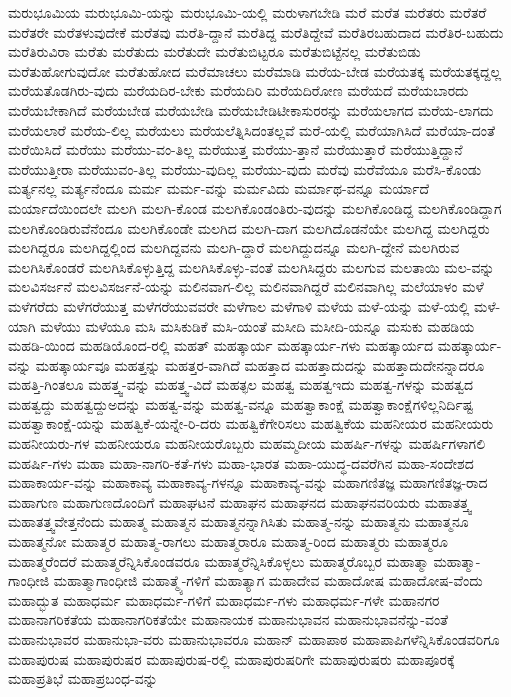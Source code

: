 {ಮರುಭೂಮಿಯ
ಮರುಭೂಮಿ-ಯನ್ನು
ಮರುಭೂಮಿ-ಯಲ್ಲಿ
ಮರುಳಾಗಬೇಡಿ
ಮರೆ
ಮರೆತ
ಮರೆತರು
ಮರೆತರೆ
ಮರೆತರೇ
ಮರೆತಳುವುದೇಕೆ
ಮರೆತವು
ಮರೆತಿ-ದ್ದಾನೆ
ಮರೆತಿದ್ದ
ಮರೆತಿದ್ದೇವೆ
ಮರೆತಿರಬಹುದಾದ
ಮರೆತಿರ-ಬಹುದು
ಮರೆತಿರುವಿರಾ
ಮರೆತು
ಮರೆತುದು
ಮರೆತುದೇ
ಮರೆತುಬಿಟ್ಟರೂ
ಮರೆತುಬಿಟ್ಟೆನಲ್ಲ
ಮರೆತುಬಿಡು
ಮರೆತುಹೋಗುವುದೋ
ಮರೆತುಹೋದ
ಮರೆಮಾಚಲು
ಮರೆಮಾಡಿ
ಮರೆಯ-ಬೇಡ
ಮರೆಯತಕ್ಕ
ಮರೆಯತಕ್ಕದ್ದಲ್ಲ
ಮರೆಯತೊಡಗಿರು-ವುದು
ಮರೆಯದಿರ-ಬೇಕು
ಮರೆಯದಿರಿ
ಮರೆಯದಿರೋಣ
ಮರೆಯದೆ
ಮರೆಯಬಾರದು
ಮರೆಯಬೇಕಾಗಿದೆ
ಮರೆಯಬೇಡ
ಮರೆಯಬೇಡಿ
ಮರೆಯಬೇಡಿಟೀಕಾಸುರರನ್ನು
ಮರೆಯಲಾಗದ
ಮರೆಯ-ಲಾಗದು
ಮರೆಯಲಾರೆ
ಮರೆಯ-ಲಿಲ್ಲ
ಮರೆಯಲು
ಮರೆಯಲೆತ್ನಿಸಿದಂತಲ್ಲವೆ
ಮರೆ-ಯಲ್ಲಿ
ಮರೆಯಾಗಿಸಿದೆ
ಮರೆಯಾ-ದಂತೆ
ಮರೆಯಿಸಿದೆ
ಮರೆಯು
ಮರೆಯು-ವಂ-ತಿಲ್ಲ
ಮರೆಯುತ್ತ
ಮರೆಯು-ತ್ತಾನೆ
ಮರೆಯುತ್ತಾರೆ
ಮರೆಯುತ್ತಿದ್ದಾನೆ
ಮರೆಯುತ್ತೀರಾ
ಮರೆಯುವಂ-ತಿಲ್ಲ
ಮರೆಯು-ವುದಿಲ್ಲ
ಮರೆಯು-ವುದು
ಮರೆವು
ಮರೆವೆಯೂ
ಮರೆಸಿ-ಕೊಂಡು
ಮರ್ತ್ಯನಲ್ಲ
ಮರ್ತ್ಯನೆಂದೂ
ಮರ್ಮ
ಮರ್ಮ-ವನ್ನು
ಮರ್ಮವಿದು
ಮರ್ಮಾಥ-ವನ್ನೂ
ಮರ್ಯಾದೆ
ಮರ್ಯಾದೆಯಿಂದಲೇ
ಮಲಗಿ
ಮಲಗಿ-ಕೊಂಡ
ಮಲಗಿಕೊಂಡಂತಿರು-ವುದನ್ನು
ಮಲಗಿಕೊಂಡಿದ್ದ
ಮಲಗಿಕೊಂಡಿದ್ದಾಗ
ಮಲಗಿಕೊಂಡಿರುವೆನೆಂದೂ
ಮಲಗಿಕೊಂಡೇ
ಮಲಗಿದ
ಮಲಗಿ-ದಾಗ
ಮಲಗಿದೊಡನೆಯೇ
ಮಲಗಿದ್ದ
ಮಲಗಿದ್ದರು
ಮಲಗಿದ್ದರೂ
ಮಲಗಿದ್ದಲ್ಲಿಂದ
ಮಲಗಿದ್ದವನು
ಮಲಗಿ-ದ್ದಾರೆ
ಮಲಗಿದ್ದುದನ್ನೂ
ಮಲಗಿ-ದ್ದೇನೆ
ಮಲಗಿರುವ
ಮಲಗಿಸಿಕೊಂಡರೆ
ಮಲಗಿಸಿಕೊಳ್ಳುತ್ತಿದ್ದ
ಮಲಗಿಸಿಕೊಳ್ಳು-ವಂತೆ
ಮಲಗಿಸಿದ್ದರು
ಮಲಗುವ
ಮಲತಾಯಿ
ಮಲ-ವನ್ನು
ಮಲವಿಸರ್ಜನೆ
ಮಲವಿಸರ್ಜನೆ-ಯನ್ನು
ಮಲಿನವಾಗ-ಲಿಲ್ಲ
ಮಲಿನವಾಗಿದ್ದರೆ
ಮಲಿನವಾಗಿಲ್ಲ
ಮಲೆಯಾಳಂ
ಮಳೆ
ಮಳೆಗರೆದು
ಮಳೆಗರೆಯುತ್ತ
ಮಳೆಗರೆಯುವವರೇ
ಮಳೆಗಾಲ
ಮಳೆಗಾಳಿ
ಮಳೆಯ
ಮಳೆ-ಯನ್ನು
ಮಳೆ-ಯಲ್ಲಿ
ಮಳೆ-ಯಾಗಿ
ಮಳೆಯು
ಮಳೆಯೂ
ಮಸಿ
ಮಸಿಕುಡಿಕೆ
ಮಸಿ-ಯಂತೆ
ಮಸೀದಿ
ಮಸೀದಿ-ಯನ್ನೂ
ಮಸುಕು
ಮಹಡಿಯ
ಮಹಡಿ-ಯಿಂದ
ಮಹಡಿಯೊಂದ-ರಲ್ಲಿ
ಮಹತ್
ಮಹತ್ಕಾರ್ಯ
ಮಹತ್ಕಾರ್ಯ-ಗಳು
ಮಹತ್ಕಾರ್ಯದ
ಮಹತ್ಕಾರ್ಯ-ವನ್ನು
ಮಹತ್ಕಾರ್ಯವೂ
ಮಹತ್ತನ್ನು
ಮಹತ್ತರ-ವಾಗಿದೆ
ಮಹತ್ತಾದ
ಮಹತ್ತಾದುದನ್ನು
ಮಹತ್ತಾದುದೇನನ್ನಾದರೂ
ಮಹತ್ತಿ-ಗಿಂತಲೂ
ಮಹತ್ತ್ವ-ವನ್ನು
ಮಹತ್ತ್ವ-ವಿದೆ
ಮಹತ್ಫಲ
ಮಹತ್ವ
ಮಹತ್ವಇದು
ಮಹತ್ವ-ಗಳನ್ನು
ಮಹತ್ವದ
ಮಹತ್ವದ್ದು
ಮಹತ್ವದ್ದುಅದನ್ನು
ಮಹತ್ವ-ವನ್ನು
ಮಹತ್ವ-ವನ್ನೂ
ಮಹತ್ವಾಕಾಂಕ್ಷೆ
ಮಹತ್ವಾಕಾಂಕ್ಷೆಗಳಿಲ್ಲನಿರ್ದಿಷ್ಟ
ಮಹತ್ವಾಕಾಂಕ್ಷೆ-ಯನ್ನು
ಮಹತ್ವಿಕೆ-ಯನ್ನೇ-ರಿ-ದರು
ಮಹತ್ವಿಕೆಗೇರಿಸಲು
ಮಹತ್ವಿಕೆಯ
ಮಹನೀಯರ
ಮಹನೀಯರು
ಮಹನೀಯರು-ಗಳ
ಮಹನೀಯರೂ
ಮಹನೀಯರೊಬ್ಬರು
ಮಹಮ್ಮದೀಯ
ಮಹರ್ಷಿ-ಗಳನ್ನು
ಮಹರ್ಷಿಗಳಾಗಲಿ
ಮಹರ್ಷಿ-ಗಳು
ಮಹಾ
ಮಹಾ-ನಾಗರಿ-ಕತೆ-ಗಳು
ಮಹಾ-ಭಾರತ
ಮಹಾ-ಯುದ್ಧ-ದವರೆಗಿನ
ಮಹಾ-ಸಂದೇಶದ
ಮಹಾಕಾರ್ಯ-ವನ್ನು
ಮಹಾಕಾವ್ಯ
ಮಹಾಕಾವ್ಯ-ಗಳನ್ನೂ
ಮಹಾಕಾವ್ಯ-ವನ್ನು
ಮಹಾಗಣಿತಜ್ಞ
ಮಹಾಗಣಿತಜ್ಞ-ರಾದ
ಮಹಾಗುಣ
ಮಹಾಗುಣದೊಂದಿಗೆ
ಮಹಾಘಟನೆ
ಮಹಾಘನ
ಮಹಾಘನದ
ಮಹಾಘನವರಿಯರು
ಮಹಾತತ್ತ್ವ
ಮಹಾತತ್ತ್ವವೇತ್ತನೆಂದು
ಮಹಾತ್ಮ
ಮಹಾತ್ಮನ
ಮಹಾತ್ಮನನ್ನಾಗಿಸಿತು
ಮಹಾತ್ಮ-ನನ್ನು
ಮಹಾತ್ಮನು
ಮಹಾತ್ಮನೂ
ಮಹಾತ್ಮನೋ
ಮಹಾತ್ಮರ
ಮಹಾತ್ಮ-ರಾಗಲು
ಮಹಾತ್ಮರಾರೂ
ಮಹಾತ್ಮ-ರಿಂದ
ಮಹಾತ್ಮರು
ಮಹಾತ್ಮರೂ
ಮಹಾತ್ಮರೆಂದರೆ
ಮಹಾತ್ಮರೆನ್ನಿಸಿಕೊಂಡವರೂ
ಮಹಾತ್ಮರೆನ್ನಿಸಿಕೊಳ್ಳಲು
ಮಹಾತ್ಮರೊಬ್ಬರ
ಮಹಾತ್ಮಾ
ಮಹಾತ್ಮಾ-ಗಾಂಧೀಜಿ
ಮಹಾತ್ಮಾಗಾಂಧೀಜಿ
ಮಹಾತ್ಮ್ಯೆ-ಗಳಿಗೆ
ಮಹಾತ್ಯಾಗ
ಮಹಾದೇವ
ಮಹಾದೋಷ
ಮಹಾದೋಷ-ವೆಂದು
ಮಹಾದ್ಭುತ
ಮಹಾಧರ್ಮ
ಮಹಾಧರ್ಮ-ಗಳಿಗೆ
ಮಹಾಧರ್ಮ-ಗಳು
ಮಹಾಧರ್ಮ-ಗಳೇ
ಮಹಾನಗರ
ಮಹಾನಾಗರಿಕತೆಯ
ಮಹಾನಾಗರಿಕತೆಯೇ
ಮಹಾನಾಯಕ
ಮಹಾನುಭಾವನ
ಮಹಾನುಭಾವನೆನ್ನು-ವಂತೆ
ಮಹಾನುಭಾವರ
ಮಹಾನುಭಾ-ವರು
ಮಹಾನುಭಾವರೂ
ಮಹಾನ್
ಮಹಾಪಾಠ
ಮಹಾಪಾಪಿಗಳೆನ್ನಿಸಿಕೊಂಡವರಿಗೂ
ಮಹಾಪುರುಷ
ಮಹಾಪುರುಷರ
ಮಹಾಪುರುಷ-ರಲ್ಲಿ
ಮಹಾಪುರುಷರಿಗೇ
ಮಹಾಪುರುಷರು
ಮಹಾಪೂರಕ್ಕೆ
ಮಹಾಪ್ರತಿಭೆ
ಮಹಾಪ್ರಬಂಧ-ವನ್ನು
}
